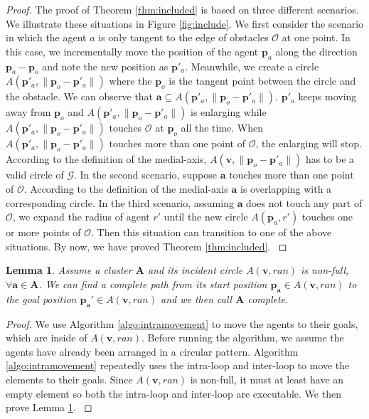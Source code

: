\documentclass[letterpaper]{article}
\newtheorem{lemma}{Lemma}
\theoremstyle{definition}
\theoremstyle{plain}
\theoremstyle{definition}
\theoremstyle{remark}
\begin{document}
\begin{proof}
The proof of Theorem \ref{thm:included} is based on three different scenarios. We illustrate these situations in Figure \ref{fig:include}.
We first consider the scenario in which the agent $a$  is only tangent to the edge of obstacles $\mathcal{O}$ at one point. In this case, we incrementally move the position of the agent $\mathbf p_a$ along
the direction $\mathbf p_a- \mathbf p_o$ and note the new position as $\mathbf p'_a$. 
Meanwhile, we create a circle $A(\mathbf p'_a,\|\mathbf p_o- \mathbf p'_a\|)$ where the $\mathbf p_o$ is the tangent point between the circle and the obstacle. We can observe that $\mathbf a \subseteq A(\mathbf p'_a,\|\mathbf p_o- \mathbf p'_a\|)$. $\mathbf p'_a$ keeps moving away from $\mathbf p_o$ and $A(\mathbf p'_a,\|\mathbf p_o- \mathbf p'_a\|)$ is enlarging while $A(\mathbf p'_a,\|\mathbf p_o- \mathbf p'_a\|)$ touches $\mathcal{O} $ at $\mathbf p_o$ all the time. 
When $A(\mathbf p'_a,\|\mathbf p_o- \mathbf p'_a\|)$ touches more than one point of $\mathcal{O}$, the enlarging will stop. According to the definition of the medial-axis, $A(\mathbf v,\|\mathbf p_o- \mathbf p'_a\|)$ has to be a valid circle of $\mathcal G$.
In the second scenario, suppose $\mathbf a$ touches more than one point of $\mathcal{O}$. According to the definition of the medial-axis $\mathbf a$ is overlapping with a corresponding circle.
In the third scenario, assuming $\mathbf a$ does not touch any part of $\mathcal{O}$, we expand the radius of agent $r'$ until the new circle $A(\mathbf p_a, r')$ touches one or more points of $\mathcal{O}$. Then this situation can transition to one of the above situations. By now, we have proved Theorem \ref{thm:included}. 
\label{proof:included}
\end{proof}




\begin{lemma}
Assume a cluster $\mathbf{A}$ and its incident circle $A(\mathbf v,ran)$ is non-full, $\forall \mathbf{a} \in \mathbf{A}$. We can find a complete path from its start position $\mathbf{p_a} \in A(\mathbf v,ran)$ to the goal position $\mathbf{p_a'} \in A(\mathbf v,ran)$ and we then call $\mathbf{A}$ complete. 
\label{lem:intra-unit complete}
\end{lemma}
\begin{proof}
We use Algorithm \ref{algo:intramovement} to move the agents to their goals, which are inside of $A(\mathbf v,ran)$. Before running the algorithm, we assume the agents have already been arranged in a circular pattern.
Algorithm \ref{algo:intramovement} repeatedly uses the intra-loop and inter-loop to move the elements to their goals. Since $A(\mathbf v,ran)$ is non-full, it must at least have an empty element so both the intra-loop and inter-loop are executable. We then prove Lemma \ref{lem:intra-unit complete}.
\label{proof:intra-unit complete}
\end{proof}
\end{document}
